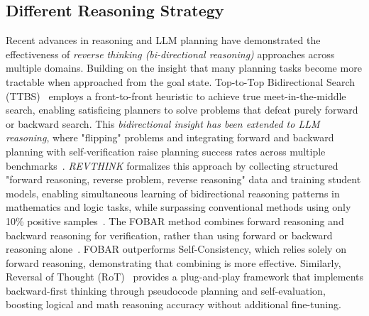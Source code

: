 \documentclass[11pt]{article}
\theoremstyle{definition}
\theoremstyle{remark}
\begin{document}
\subsection{Different Reasoning Strategy}
Recent advances in reasoning and LLM planning have demonstrated the effectiveness of \textit{reverse thinking (bi-directional reasoning)} approaches across multiple domains.
Building on the insight that many planning tasks become more tractable when approached from the goal state. Top-to-Top Bidirectional Search (TTBS)~\citep{kuroiwa2020front} employs a front-to-front heuristic to achieve true meet-in-the-middle search, enabling satisficing planners to solve problems that defeat purely forward or backward search. This \textit{bidirectional insight has been extended to LLM reasoning}, where "flipping" problems and integrating forward and backward planning with self-verification raise planning success rates across multiple benchmarks~\citep{ren2024thinking}. \textit{REVTHINK} formalizes this approach by collecting structured "forward reasoning, reverse problem, reverse reasoning" data and training student models, enabling simultaneous learning of bidirectional reasoning patterns in
mathematics and logic tasks, while surpassing conventional methods using only 10\% positive samples~\citep{chen2024reverse}. The FOBAR method combines forward reasoning and backward reasoning for verification, rather than using forward or backward reasoning alone~\citep{jiang2024forward}. FOBAR outperforms Self-Consistency, which relies solely on forward reasoning, demonstrating that combining is more effective. Similarly, Reversal of Thought (RoT)~\citep{yuan-etal-2025-reversal} provides a plug-and-play framework that implements backward-first thinking through pseudocode planning and self-evaluation, boosting logical and math reasoning accuracy without additional fine-tuning.
\end{document}
